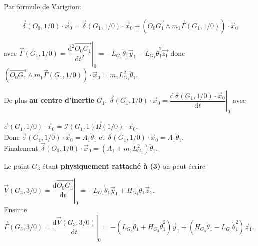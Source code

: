 \ifprof
\begin{corrige}
Par formule de Varignon:

$$ \overrightarrow{\delta}(O_0,1/0)\cdot \overrightarrow{x}_0 = \overrightarrow{\delta}(G_1,1/0)\cdot \overrightarrow{x}_0 + \left( \overrightarrow{O_0 G_1} \wedge m_1 \overrightarrow{\Gamma}(G_1,1/0) \right)\cdot \overrightarrow{x}_0 $$

avec $\overrightarrow{\Gamma}(G_1,1/0) = \left. \dfrac{\mathrm{d}^2\overrightarrow{O_0 G_1}}{\mathrm{d}t^2} \right|_0 = -L_{G_1}\ddot{\theta}_1 \overrightarrow{y}_1 -L_{G_1}\dot{\theta}_1^2\overrightarrow{z_1}$ donc $\left( \overrightarrow{O_0 G_1} \wedge m_1 \overrightarrow{\Gamma}(G_1,1/0) \right)\cdot \overrightarrow{x}_0 = m_1 L_{G_1}^2\ddot{\theta}_1$.

De plus \textbf{au centre d'inertie} $G_1$: $\overrightarrow{\delta}(G_1,1/0)\cdot \overrightarrow{x}_0 = \left. \dfrac{\mathrm{d}\overrightarrow{\sigma}(G_1,1/0)\cdot \overrightarrow{x}_0}{\mathrm{d}t} \right|_0$ avec 

$\overrightarrow{\sigma}(G_1,1/0)\cdot \overrightarrow{x}_0 = \mathcal{I}(G_1,1)\overrightarrow{\Omega}(1/0)\cdot \overrightarrow{x}_0$.\\

Donc $\overrightarrow{\sigma}(G_1,1/0)\cdot \overrightarrow{x}_0 = A_1 \dot{\theta}_1$ et $\overrightarrow{\delta}(G_1,1/0)\cdot \overrightarrow{x}_0 = A_1 \ddot{\theta}_1$.\\

Finalement $\boxed{\overrightarrow{\delta}(O_0,1/0)\cdot \overrightarrow{x}_0 = (A_1 + m_1 L_{G_1}^2)\ddot{\theta}_1}$.

\end{corrige}
\else
\fi

\ifprof
\begin{corrige}
Le point $G_3$ étant \textbf{physiquement rattaché à (3)} on peut écrire 

$\boxed{\overrightarrow{V}(G_3,3/0) = \left. \dfrac{\mathrm{d}\overrightarrow{O_0 G_3}}{\mathrm{d}t} \right|_0 = -L_{G_3}\dot{\theta}_1\overrightarrow{y}_1 + H_{G_3}\dot{\theta}_1\overrightarrow{z}_1}$.\\

Ensuite $\boxed{\overrightarrow{\Gamma}(G_3,3/0) = \left. \dfrac{\mathrm{d}\overrightarrow{V}(G_3,3/0)}{\mathrm{d}t} \right|_0 = -\left(L_{G_3}\ddot{\theta}_1 + H_{G_3}\dot{\theta}_1^2\right)\overrightarrow{y}_1 + \left(H_{G_3}\ddot{\theta}_1 - L_{G_3}\dot{\theta}_1^2\right)\overrightarrow{z}_1}$.

\end{corrige}
\else
\fi

